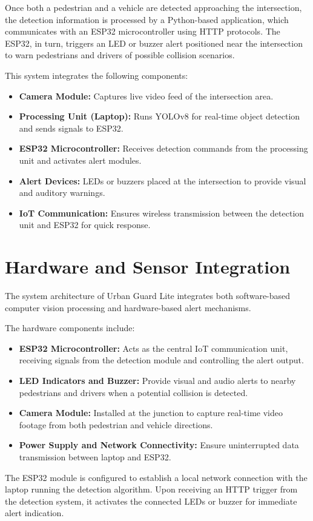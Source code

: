 \documentclass[a4paper, 12pt]{report}
\begin{document}
Once both a pedestrian and a vehicle are detected approaching the intersection, the detection information is processed by a Python-based application, which communicates with an ESP32 microcontroller using HTTP protocols. The ESP32, in turn, triggers an LED or buzzer alert positioned near the intersection to warn pedestrians and drivers of possible collision scenarios.

This system integrates the following components:
\begin{itemize}[itemsep=-4pt]
    \item \textbf{Camera Module:} Captures live video feed of the intersection area.
    \item \textbf{Processing Unit (Laptop):} Runs YOLOv8 for real-time object detection and sends signals to ESP32.
    \item \textbf{ESP32 Microcontroller:} Receives detection commands from the processing unit and activates alert modules.
    \item \textbf{Alert Devices:} LEDs or buzzers placed at the intersection to provide visual and auditory warnings.
    \item \textbf{IoT Communication:} Ensures wireless transmission between the detection unit and ESP32 for quick response.
\end{itemize}


\section{Hardware and Sensor Integration}
The system architecture of Urban Guard Lite integrates both software-based computer vision processing and hardware-based alert mechanisms.

The hardware components include:
\begin{itemize}[itemsep=-4pt]
    \item \textbf{ESP32 Microcontroller:} Acts as the central IoT communication unit, receiving signals from the detection module and controlling the alert output.
    \item \textbf{LED Indicators and Buzzer:} Provide visual and audio alerts to nearby pedestrians and drivers when a potential collision is detected.
    \item \textbf{Camera Module:} Installed at the junction to capture real-time video footage from both pedestrian and vehicle directions.
    \item \textbf{Power Supply and Network Connectivity:} Ensure uninterrupted data transmission between laptop and ESP32.
\end{itemize}
The ESP32 module is configured to establish a local network connection with the laptop running the detection algorithm. Upon receiving an HTTP trigger from the detection system, it activates the connected LEDs or buzzer for immediate alert indication.
\end{document}
